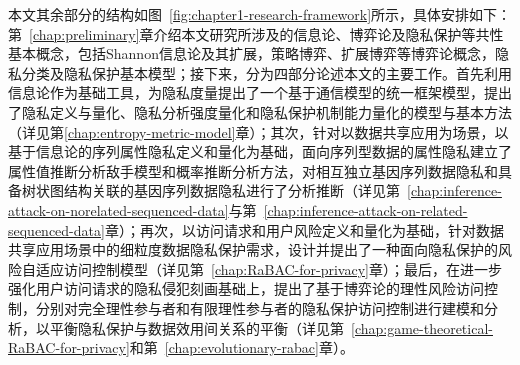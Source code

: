 本文其余部分的结构如图~\ref{fig:chapter1-research-framework}所示，具体安排如下：第~\ref{chap:preliminary}章介绍本文研究所涉及的信息论、博弈论及隐私保护等共性基本概念，包括Shannon信息论及其扩展，策略博弈、扩展博弈等博弈论概念，隐私分类及隐私保护基本模型；接下来，分为四部分论述本文的主要工作。首先利用信息论作为基础工具，为隐私度量提出了一个基于通信模型的统一框架模型，提出了隐私定义与量化、隐私分析强度量化和隐私保护机制能力量化的模型与基本方法（详见第\ref{chap:entropy-metric-model}章）；其次，针对以数据共享应用为场景，以基于信息论的序列属性隐私定义和量化为基础，面向序列型数据的属性隐私建立了属性值推断分析敌手模型和概率推断分析方法，对相互独立基因序列数据隐私和具备树状图结构关联的基因序列数据隐私进行了分析推断（详见第~\ref{chap:inference-attack-on-norelated-sequenced-data}与第~\ref{chap:inference-attack-on-related-sequenced-data}章）；再次，以访问请求和用户风险定义和量化为基础，针对数据共享应用场景中的细粒度数据隐私保护需求，设计并提出了一种面向隐私保护的风险自适应访问控制模型（详见第~\ref{chap:RaBAC-for-privacy}章）；最后，在进一步强化用户访问请求的隐私侵犯刻画基础上，提出了基于博弈论的理性风险访问控制，分别对完全理性参与者和有限理性参与者的隐私保护访问控制进行建模和分析，以平衡隐私保护与数据效用间关系的平衡（详见第~\ref{chap:game-theoretical-RaBAC-for-privacy}和第~\ref{chap:evolutionary-rabac}章）。
